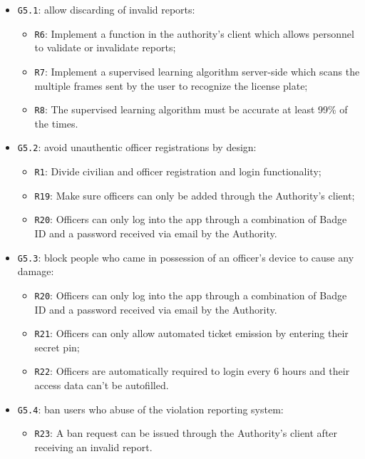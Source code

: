 \documentclass[12pt,a4paper]{article}
\begin{document}
	\begin{itemize}
	\item \texttt{G5.1}: allow discarding of invalid reports:
							\begin{itemize}
									\item \texttt{R6}: Implement a function in the authority's client which allows personnel to validate or invalidate reports;
									\item \texttt{R7}: Implement a supervised learning algorithm server-side which scans the multiple frames sent by the user to recognize the license plate;
									\item \texttt{R8}: The supervised learning algorithm must be accurate at least 99\% of the times.
							\end{itemize}
	\item \texttt{G5.2}: avoid unauthentic officer registrations by design:
							\begin{itemize}
									\item \texttt{R1}: Divide civilian and officer registration and login functionality;
									\item \texttt{R19}: Make sure officers can only be added through the Authority's client;
									\item \texttt{R20}: Officers can only log into the app through a combination of Badge ID and a password received via email by the Authority.
							\end{itemize}
	\item \texttt{G5.3}: block people who came in possession of an officer's device to cause any damage:
							\begin{itemize}
									\item \texttt{R20}: Officers can only log into the app through a combination of Badge ID and a password received via email by the Authority.
									\item \texttt{R21}: Officers can only allow automated ticket emission by entering their secret pin;
									\item \texttt{R22}: Officers are automatically required to login every 6 hours and their access data can't be autofilled.
							\end{itemize}
	\item \texttt{G5.4}: ban users who abuse of the violation reporting system:
							\begin{itemize}
									\item \texttt{R23}: A ban request can be issued through the Authority's client after receiving an invalid report.
							\end{itemize}
	\end{itemize}
	
\end{document}

